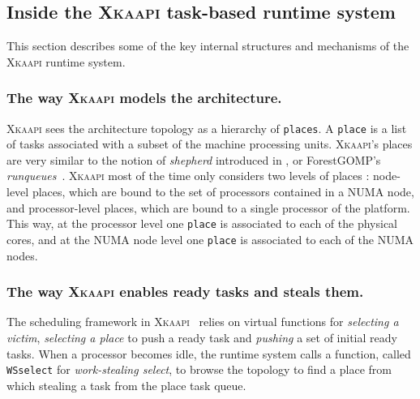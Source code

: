 \documentclass{Styles/llncs}
\newcommand{\kaapi}{\textsc{\mbox{Xkaapi}}\xspace}
\begin{document}
\subsection{Inside the \kaapi task-based runtime system}

This section describes some of the key internal structures and mechanisms of the \kaapi runtime system.

\subsubsection{The way \kaapi models the architecture.}


\kaapi sees the architecture topology as a hierarchy of \verb/places/.
A \verb/place/ is a list of tasks associated with a subset of the machine processing units.
\kaapi's places are very similar to the notion of \emph{shepherd} introduced in \cite{DBLP:journals/ijhpca/OlivierPWSP12}, or ForestGOMP's \emph{runqueues}~\cite{BroFurGogWacNam10IJPP}.
\kaapi most of the time only considers two levels of places : node-level places, which are bound to the set of processors contained in a NUMA node, and processor-level places, which are bound to a single processor of the platform.
This way, at the processor level one \verb/place/ is associated to each of the physical cores, and
at the NUMA node level one \verb/place/ is associated to each of the NUMA nodes.


\subsubsection{The way \kaapi enables ready tasks and steals them.}
The scheduling framework in \kaapi~\cite{Bleuse2014} relies on virtual functions for \textit{selecting a victim}, \textit{selecting a place} to push a ready task and \textit{pushing} a set of initial ready tasks.
When a processor becomes idle, the runtime system calls a function, called  \verb/WSselect/ for \emph{work-stealing select}, to browse the topology to find a place from which stealing a task from the place task queue.
\end{document}
